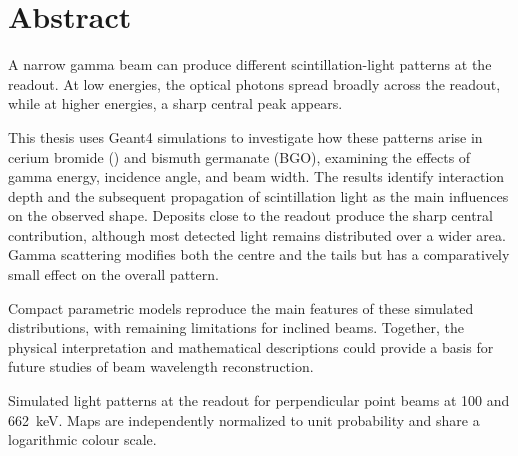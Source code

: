 \documentclass[a4paper,thesis=student,english,oneside,openany,coverpage=false,titlepage=false]{tumbook}
\title{\ThesisTitle}
\subtitle{\ThesisSubtitle}
\author{\ThesisAuthor}
\begin{document}
\frontmatter


\chapter{Abstract}

A narrow gamma beam can produce different scintillation-light patterns at the readout. At low energies, the optical photons spread broadly across the readout, while at higher energies, a sharp central peak appears.

This thesis uses Geant4 simulations to investigate how these patterns arise in cerium bromide () and bismuth germanate (BGO), examining the effects of gamma energy, incidence angle, and beam width. The results identify interaction depth and the subsequent propagation of scintillation light as the main influences on the observed shape. Deposits close to the readout produce the sharp central contribution, although most detected light remains distributed over a wider area. Gamma scattering modifies both the centre and the tails but has a comparatively small effect on the overall pattern.

Compact parametric models reproduce the main features of these simulated distributions, with remaining limitations for inclined beams. Together, the physical interpretation and mathematical descriptions could provide a basis for future studies of beam wavelength reconstruction.

\par\vspace{1.5\baselineskip}
\noindent\begin{minipage}{\textwidth}
  \centering
  \par\smallskip
  {\small\raggedright
  Simulated  light patterns at the readout for perpendicular point beams at \num{100} and \qty{662}{\kilo\electronvolt}. Maps are independently normalized to unit probability and share a logarithmic colour scale.\par}
\end{minipage}

\tableofcontents

\mainmatter







\appendix


\printbibliography[title={References}]
\end{document}
